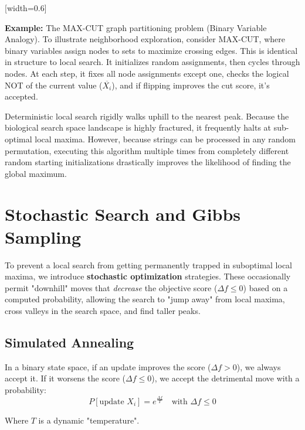 [width=0.6\textwidth]

\textbf{Example:} The MAX-CUT graph partitioning problem (Binary Variable Analogy).
To illustrate neighborhood exploration, consider MAX-CUT, where binary variables assign nodes to sets to maximize crossing edges. This is identical in structure to local search. It initializes random assignments, then cycles through nodes. At each step, it fixes all node assignments except one, checks the logical NOT of the current value ($\overline{X_i}$), and if flipping improves the cut score, it's accepted.

\sta Deterministic local search rigidly walks uphill to the nearest peak. Because the biological search space landscape is highly fractured, it frequently halts at sub-optimal local maxima. However, because strings can be processed in any random permutation, executing this algorithm multiple times from completely different random starting initializations drastically improves the likelihood of finding the global maximum.


\section{Stochastic Search and Gibbs Sampling}
To prevent a local search from getting permanently trapped in suboptimal local maxima, we introduce \textbf{stochastic optimization} strategies. These occasionally permit "downhill" moves that \textit{decrease} the objective score ($\Delta f \leq 0$) based on a computed probability, allowing the search to "jump away" from local maxima, cross valleys in the search space, and find taller peaks.

\subsection{Simulated Annealing}
In a binary state space, if an update improves the score ($\Delta f > 0$), we always accept it. If it worsens the score ($\Delta f \le 0$), we accept the detrimental move with a probability:
\[ P[\text{update } X_i] = e^{\frac{\Delta f}{T}} \quad \text{with } \Delta f \le 0 \]

Where $T$ is a dynamic "temperature". 

